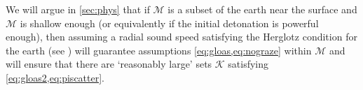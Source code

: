 \documentclass[
	fontsize=11pt, 
	twoside=false, 
	abstract=true, 
	a4paper,
]{scrartcl}
\begin{document}
We will argue in \cref{sec:phys} that if $\mathcal{M}$ is a subset of the earth near the surface and $\mathcal{M}$ is shallow enough (or equivalently if the initial detonation is powerful enough), then assuming a radial sound speed satisfying the Herglotz condition for the earth (see \cite[\S~2.1.2]{zbMATH07625517}) will guarantee assumptions \cref{eq:gloas,eq:nograze} within $\mathcal{M}$ and will ensure that there are `reasonably large' sets $\mathcal{K}$ satisfying \cref{eq:gloas2,eq:piscatter}.

\end{document}
